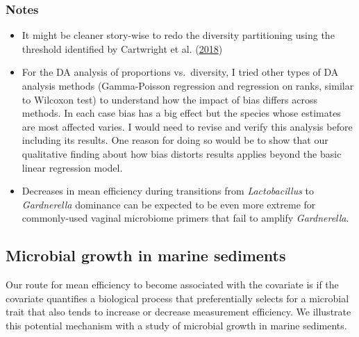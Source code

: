 \documentclass[
]{article}
\providecommand{\tightlist}{%
  \setlength{\itemsep}{0pt}\setlength{\parskip}{0pt}}
\begin{document}
\hypertarget{notes}{%
\subsubsection{Notes}\label{notes}}

\begin{itemize}
\tightlist
\item
  It might be cleaner story-wise to redo the diversity partitioning using the threshold identified by Cartwright et al. (\protect\hyperlink{ref-cartwright2018mult}{2018})
\item
  For the DA analysis of proportions vs.~diversity, I tried other types of DA analysis methods (Gamma-Poisson regression and regression on ranks, similar to Wilcoxon test) to understand how the impact of bias differs across methods. In each case bias has a big effect but the species whose estimates are most affected varies. I would need to revise and verify this analysis before including its results. One reason for doing so would be to show that our qualitative finding about how bias distorts results applies beyond the basic linear regression model.
\item
  Decreases in mean efficiency during transitions from \emph{Lactobacillus} to \emph{Gardnerella} dominance can be expected to be even more extreme for commonly-used vaginal microbiome primers that fail to amplify \emph{Gardnerella}.
\end{itemize}

\hypertarget{microbial-growth-in-marine-sediments}{%
\subsection{Microbial growth in marine sediments}\label{microbial-growth-in-marine-sediments}}

Our route for mean efficiency to become associated with the covariate is if the covariate quantifies a biological process that preferentially selects for a microbial trait that also tends to increase or decrease measurement efficiency.
We illustrate this potential mechanism with a study of microbial growth in marine sediments.
\end{document}
